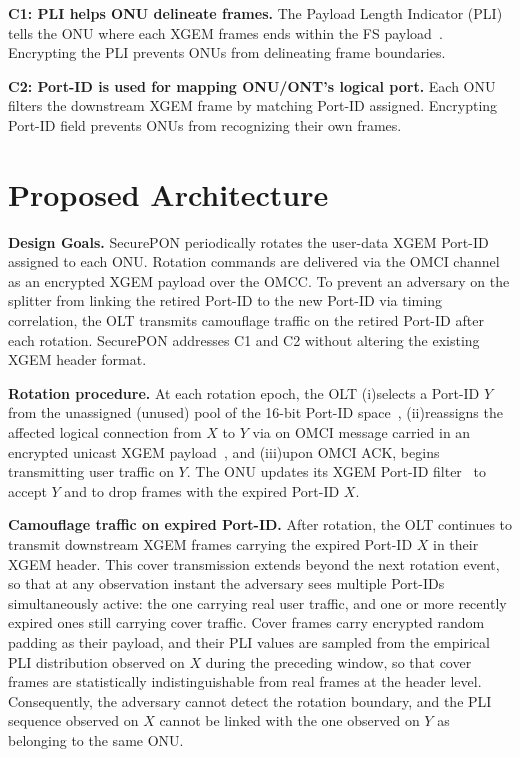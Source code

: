 \documentclass[sigconf]{acmart}
\begin{document}
\smallskip
\noindent\textbf{C1: PLI helps ONU delineate frames.} 
The Payload Length Indicator (PLI) tells the ONU where each XGEM frames ends within the FS payload~\cite[\S 9.2 XGEM frame delineation]{itu-NGPON2}. Encrypting the PLI prevents ONUs from delineating frame boundaries.

\smallskip
\noindent\textbf{C2: Port-ID is used for mapping ONU/ONT's logical port.} 
Each ONU filters the downstream XGEM frame by matching Port-ID assigned. Encrypting Port-ID field prevents ONUs from recognizing their own frames.



\section{Proposed Architecture}
\smallskip
\noindent\textbf{Design Goals.}
SecurePON periodically rotates the user-data XGEM Port-ID assigned to each ONU. Rotation commands are delivered via the OMCI channel~\cite{itu-50GPON} as an encrypted XGEM payload over the OMCC.
To prevent an adversary on the splitter from linking the retired Port-ID to the new Port-ID via timing correlation, the OLT transmits camouflage traffic on the retired Port-ID after each rotation. SecurePON addresses C1 and C2 without altering the existing XGEM header format.


\noindent\textbf{Rotation procedure.} 
At each rotation epoch, the OLT (i)selects a Port-ID $Y$ from the unassigned (unused) pool of the 16-bit Port-ID space~\cite[\S6.5.2.7, Table~6-3]{itu-50GPON}, (ii)reassigns the affected logical connection from $X$ to $Y$ via on OMCI message carried in an encrypted unicast XGEM payload~\cite[\S15.4]{itu-50GPON}, and (iii)upon OMCI ACK, begins transmitting user traffic on $Y$. The ONU updates its XGEM Port-ID filter~\cite[\S6.3.1]{itu-50GPON} to accept $Y$ and to drop frames with the expired Port-ID $X$.


\noindent\textbf{Camouflage traffic on expired Port-ID.}
After rotation, the OLT continues to transmit downstream XGEM frames carrying the expired Port-ID $X$ in their XGEM header. This cover transmission extends beyond the next rotation event, so that at any observation instant the adversary sees multiple Port-IDs simultaneously active: the one carrying real user traffic, and one or more recently expired ones still carrying cover traffic. Cover frames carry encrypted random padding as their payload, and their PLI values are sampled from the empirical PLI distribution observed on $X$ during the preceding window, so that cover frames are statistically indistinguishable from real frames at the header level. Consequently, the adversary cannot detect the rotation boundary, and the PLI sequence observed on $X$ cannot be linked with the one observed on $Y$ as belonging to the same ONU.
\end{document}
